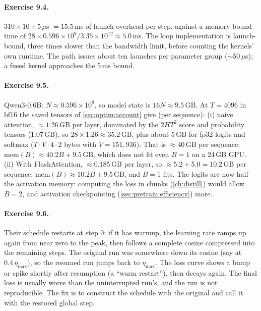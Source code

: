\paragraph{Exercise 9.4.} $310\times10\times5\,\mu$s $=15.5$\,ms of launch overhead per step,
against a memory-bound time of $28\times0.596\times10^9/3.35\times10^{12}\approx5.0$\,ms. The loop
implementation is launch-bound, three times slower than the bandwidth limit, before counting the
kernels' own runtime. The  path issues about ten launches per parameter group
($\sim$50\,$\mu$s); a fused kernel approaches the 5\,ms bound.

\paragraph{Exercise 9.5.} Qwen3-0.6B: $N\approx0.596\times10^9$, so model state is $16N\approx9.5$\,GB.
At $T=4096$ in bf16 the saved tensors of \cref{sec:optim:account} give (per sequence):
(i) naive attention, $\approx1.26$\,GB per layer, dominated by the $2HT^2$ score and probability
tensors (1.07\,GB), so $28\times1.26\approx35.2$\,GB, plus about 5\,GB for fp32 logits and softmax
($T\cdot V\cdot4\cdot2$ bytes with $V=151{,}936$). That is $\approx40$\,GB per sequence:
$\text{mem}(B)\approx40.2B+9.5$\,GB, which does not fit even $B=1$ on a 24\,GB GPU. (ii) With
FlashAttention, $\approx0.185$\,GB per layer, so $\approx5.2+5.0=10.2$\,GB per sequence:
$\text{mem}(B)\approx10.2B+9.5$\,GB, and $B=1$ fits. The logits are now half the activation memory:
computing the loss in chunks (\cref{ch:distill}) would allow $B=2$, and activation
checkpointing (\cref{sec:pretrain:efficiency}) more.

\paragraph{Exercise 9.6.} Their schedule restarts at step 0: if it has warmup, the learning rate
ramps up again from near zero to the peak, then follows a complete cosine compressed into the
remaining steps. The original run was somewhere down its cosine (say at $0.4\,\eta_{\max}$),
so the resumed run jumps back to $\eta_{\max}$. The loss curve shows a bump or spike shortly
after resumption (a ``warm restart''), then decays again. The final loss is usually worse than the
uninterrupted run's, and the run is not reproducible. The fix is to construct the schedule with the
original  and call it with the restored global step.

